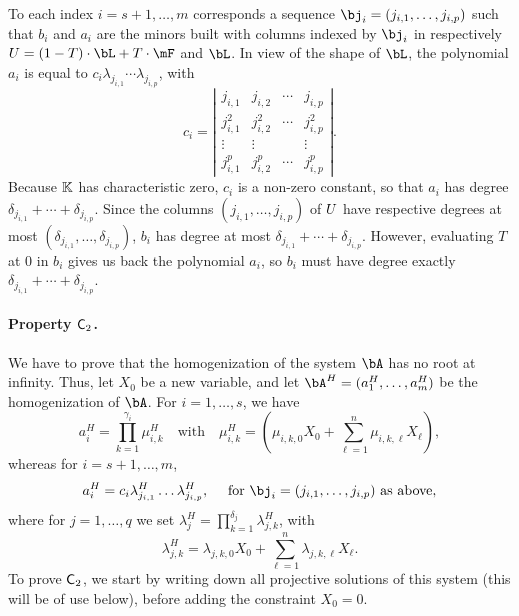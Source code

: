 \documentclass[12pt]{article}
\begin{document}
To each index $i=s+1,\dots,m$ corresponds a sequence
$\bj_i=(j_{i,1},\dots,j_{i,p})$ such that $b_i$ and $a_i$ are the
minors built with columns indexed by $\bj_i$ in respectively
$\mU=(1-T)\cdot \bL + T \cdot \mF$ and $\bL$. In view of the shape of
$\bL$, the polynomial $a_i$ is equal to $c_i\lambda_{j_{i,1}}\cdots
\lambda_{j_{i,p}}$, with
$$c_i = \left | 
\begin{matrix}
j_{i,1} & j_{i,2} & \cdots & j_{i,p}\\
j_{i,1}^2 & j_{i,2}^2 & \cdots & j_{i,p}^2\\
\vdots & \vdots &  & \vdots \\
j_{i,1}^p & j_{i,2}^p & \cdots & j_{i,p}^p
\end{matrix}
\right |.$$
Because $\mathbb{K}$ has characteristic zero,
 $c_i$ is a non-zero constant, so that $a_i$ has degree $\delta_{j_{i,1}} +
\cdots + \delta_{j_{i,p}}$.  Since the columns
$(j_{i,1},\dots,j_{i,p})$ of ${U}$ have respective degrees at most
$(\delta_{j_{i,1}},\dots,\delta_{j_{i,p}})$, $b_i$ has degree at most
$\delta_{j_{i,1}} + \cdots + \delta_{j_{i,p}}$. However, evaluating
$T$ at $0$ in $b_i$ gives us back the polynomial $a_i$, so $b_i$ must
have degree exactly $\delta_{j_{i,1}} + \cdots + \delta_{j_{i,p}}$.

\paragraph{Property $\mathsf{C}_2$.} We have to prove that the homogenization
of the system $\bA$ has no root at infinity. Thus, let $X_0$ be a new
variable, and let $\bA^H=(a_1^H,\dots,a_m^H)$ be the homogenization
of $\bA$. For $i=1,\dots,s$, we have
$$a_i^H=\prod_{k=1}^{\gamma_i} \mu^H_{i,k} \quad\text{with}\quad \mu^H_{i,k}=(\mu_{i,k,0}X_0 + \sum_{\ell = 1}^{n}\mu_{i,k,\ell}X_\ell),$$
whereas for $i=s+1,\dots,m$, 
$$a_i^H=c_i \lambda^H_{j_{i,1}}\ldots \lambda^H_{j_{i,p}}, \quad \text{~for~} \bj_i=(j_{i,1},\dots,j_{i,p}) \text{~as above},$$
where for $j=1,\dots,q$ we set 
$\lambda^H_j = \prod_{k=1}^{\delta_j}\lambda^H_{j,k}$,
with
$$\lambda^H_{j,k}=\lambda_{j,k,0}X_0 + \sum_{\ell = 1}^{n}\lambda_{j,k,\ell}X_\ell.$$
To prove  $\mathsf{C}_2$, we start by writing down all projective
solutions of this system (this will be of use below), before adding
the constraint $X_0=0$.
\end{document}
